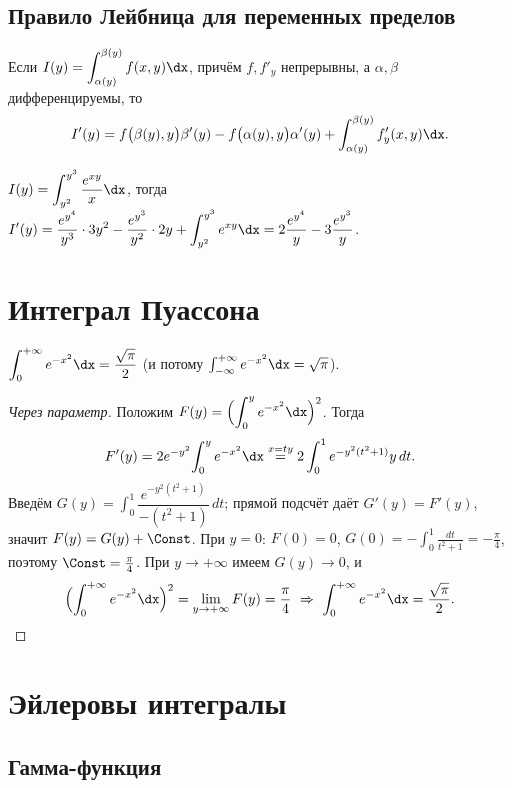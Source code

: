 \subsection{Правило Лейбница для переменных пределов}

\begin{theorem}
Если $I(y)=\displaystyle\int_{\alpha(y)}^{\beta(y)}f(x,y)\dx$, причём $f,f'_y$ непрерывны, а
$\alpha,\beta$ дифференцируемы, то
\[
  I'(y)=f\bigl(\beta(y),y\bigr)\beta'(y)-f\bigl(\alpha(y),y\bigr)\alpha'(y)
   +\int_{\alpha(y)}^{\beta(y)}f'_y(x,y)\dx .
\]
\end{theorem}

\begin{example}
$\displaystyle I(y)=\int_{y^2}^{y^3}\frac{e^{xy}}{x}\dx$, тогда
$\displaystyle I'(y)=\frac{e^{y^4}}{y^3}\cdot3y^2-\frac{e^{y^3}}{y^2}\cdot2y
+\int_{y^2}^{y^3}e^{xy}\dx=2\frac{e^{y^4}}{y}-3\frac{e^{y^3}}{y}$.
\end{example}

\section{Интеграл Пуассона}

\begin{theorem}
$\displaystyle\int_0^{+\infty}e^{-x^2}\dx=\frac{\sqrt\pi}{2}$ (и потому
$\int_{-\infty}^{+\infty}e^{-x^2}\dx=\sqrt\pi$).
\end{theorem}

\begin{proof}[Через параметр]
Положим $\displaystyle F(y)=\Bigl(\int_0^y e^{-x^2}\dx\Bigr)^2$. Тогда
\[
  F'(y)=2e^{-y^2}\!\int_0^y e^{-x^2}\dx\overset{x=ty}{=}2\int_0^1 e^{-y^2(t^2+1)}y\,dt .
\]
Введём $G(y)=\int_0^1\dfrac{e^{-y^2(t^2+1)}}{-(t^2+1)}\,dt$; прямой подсчёт даёт $G'(y)=F'(y)$,
значит $F(y)=G(y)+\Const$. При $y=0$: $F(0)=0$, $G(0)=-\int_0^1\frac{dt}{t^2+1}=-\frac\pi4$,
поэтому $\Const=\frac\pi4$. При $y\to+\infty$ имеем $G(y)\to0$, и
\[
  \Bigl(\int_0^{+\infty}e^{-x^2}\dx\Bigr)^2=\lim_{y\to+\infty}F(y)=\frac\pi4
  \ \Rightarrow\ \int_0^{+\infty}e^{-x^2}\dx=\frac{\sqrt\pi}{2}.
\]
\end{proof}

\section{Эйлеровы интегралы}

\subsection{Гамма-функция}

